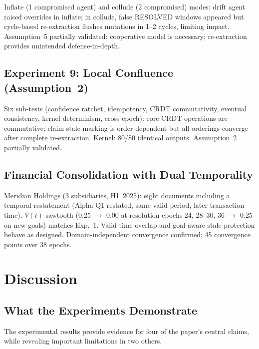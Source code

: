 \documentclass[11pt]{article}
\begin{document}
Inflate (1 compromised agent) and collude (2 compromised) modes: drift agent raised overrides in inflate; in collude, false RESOLVED windows appeared but cycle-based re-extraction flushes mutations in 1--2 cycles, limiting impact. Assumption~5 partially validated: cooperative model is necessary; re-extraction provides unintended defense-in-depth.

\subsection{Experiment 9: Local Confluence (Assumption~2)}

Six sub-tests (confidence ratchet, idempotency, CRDT commutativity, eventual consistency, kernel determinism, cross-epoch): core CRDT operations are commutative; claim stale marking is order-dependent but all orderings converge after complete re-extraction. Kernel: 80/80 identical outputs. Assumption~2 partially validated.

\subsection{Financial Consolidation with Dual Temporality}

Meridian Holdings (3 subsidiaries, H1~2025): eight documents including a temporal restatement (Alpha Q1 restated, same valid period, later transaction time). $V(t)$ sawtooth (0.25 $\to$ 0.00 at resolution epochs 24, 28--30, 36 $\to$ 0.25 on new goals) matches Exp.~1. Valid-time overlap and goal-aware stale protection behave as designed. Domain-independent convergence confirmed; 45 convergence points over 38 epochs.

\section{Discussion}
\label{sec:discussion}

\subsection{What the Experiments Demonstrate}

The experimental results provide evidence for four of the paper's central claims, while revealing important limitations in two others.
\end{document}
